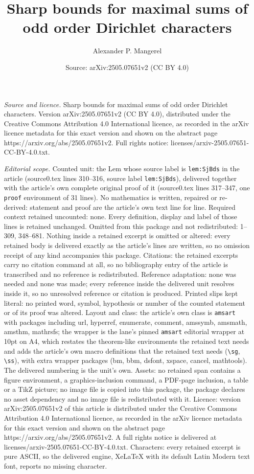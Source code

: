 \documentclass[10pt,a4paper]{amsart}
\title[Sharp bounds for maximal sums of odd order Dirichlet charact]{Sharp bounds for maximal sums of odd order Dirichlet characters}
\author{Alexander P. Mangerel}
\date{Source: arXiv:2505.07651v2 (CC BY 4.0)}
\begin{document}
\maketitle

\noindent\emph{Source and licence.} Sharp bounds for maximal sums of odd order Dirichlet characters. Version arXiv:2505.07651v2 (CC BY 4.0), distributed under the Creative Commons Attribution 4.0 International licence, as recorded in the arXiv licence metadata for this exact version and shown on the abstract page https://arxiv.org/abs/2505.07651v2. Full rights notice: licenses/arxiv-2505.07651-CC-BY-4.0.txt.\par\smallskip

\noindent\textit{Editorial scope.} Counted unit: the Lem whose source label is \texttt{lem:SjBds} in the article (source0.tex lines 310--316, source label \texttt{lem:SjBds}), delivered together with the article's own complete original proof of it (source0.tex lines 317--347, one \texttt{proof} environment of 31 lines). No mathematics is written, repaired or re-derived: statement and proof are the article's own text line for line. Required context retained uncounted: none. Every definition, display and label of those lines is retained unchanged. Omitted from this package and not redistributed: 1--309, 348--681. Nothing inside a retained excerpt is omitted or altered: every retained body is delivered exactly as the article's lines are written, so no omission receipt of any kind accompanies this package. Citations: the retained excerpts carry no citation command at all, so no bibliography entry of the article is transcribed and no reference is redistributed. Reference adaptation: none was needed and none was made; every reference inside the delivered unit resolves inside it, so no unresolved reference or citation is produced. Printed slips kept literal: no printed word, symbol, hypothesis or number of the counted statement or of its proof was altered. Layout and class: the article's own class is \texttt{amsart} with packages including url, hyperref, enumerate, comment, amssymb, amsmath, amsthm, mathrsfs; the wrapper is the lane's pinned \texttt{amsart} editorial wrapper at 10pt on A4, which restates the theorem-like environments the retained text needs and adds the article's own macro definitions that the retained text needs (\texttt{\textbackslash sg}, \texttt{\textbackslash ss}), with extra wrapper packages (bm, bbm, dsfont, xspace, cancel, mathtools). The delivered numbering is the unit's own. Assets: no retained span contains a figure environment, a graphics-inclusion command, a PDF-page inclusion, a table or a TikZ picture; no image file is copied into this package, the package declares no asset dependency and no image file is redistributed with it. Licence: version arXiv:2505.07651v2 of this article is distributed under the Creative Commons Attribution 4.0 International licence, as recorded in the arXiv licence metadata for this exact version and shown on the abstract page https://arxiv.org/abs/2505.07651v2. A full rights notice is delivered at licenses/arxiv-2505.07651-CC-BY-4.0.txt. Characters: every retained excerpt is pure ASCII, so the delivered engine, XeLaTeX with its default Latin Modern text font, reports no missing character.
\end{document}
